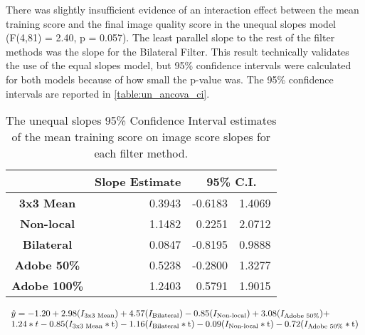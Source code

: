 \documentclass{ncjms}
\begin{document}
There was slightly insufficient evidence of an interaction effect between the mean training score and the final image quality score in the unequal slopes model (F(4,81) = 2.40, p = 0.057). The least parallel slope to the rest of the filter methods was the slope for the Bilateral Filter. This result technically validates the use of the equal slopes model, but 95\% confidence intervals were calculated for both models because of how small the p-value was. The 95\% confidence intervals are reported in \autoref{table:un_ancova_ci}.

\begin{table}[ht]
\caption{The unequal slopes 95\% Confidence Interval estimates of the mean training score on image score slopes for each filter method.} %
\centering %
\begin{tabular}{|c| r|r|r|} %
\hline %
& \multicolumn{1}{c|}{\textbf{Slope Estimate}} & \multicolumn{2}{c|}{\textbf{95\% C.I.}}  \\ [0.5ex]
\hline
\textbf{3x3 Mean} & 0.3943 & -0.6183 & 1.4069  \\ 
\textbf{Non-local} & 1.1482 & 0.2251 & 2.0712 \\
\textbf{Bilateral} & 0.0847 & -0.8195 & 0.9888 \\
\textbf{Adobe 50\%} & 0.5238 & -0.2800 & 1.3277 \\
\textbf{Adobe 100\%} & 1.2403 & 0.5791 & 1.9015 \\ [1ex]
\hline %
\end{tabular}
\label{table:un_ancova_ci} %
\end{table}


\begin{equation}
  \begin{array}{l}
    \Hat{y}=-1.20 + 2.98(I_{\text{3x3 Mean}}) + 4.57(I_{\text{Bilateral}}) - 0.85(I_{\text{Non-local}}) + 3.08(I_{\text{Adobe 50\%}}) + \\ 
    1.24*t - 0.85(I_{\text{3x3 Mean}}*\text{t}) - 1.16(I_{\text{Bilateral}}*\text{t}) - 0.09(I_{\text{Non-local}}*\text{t}) - 0.72(I_{\text{Adobe 50\%}}*\text{t})
  \end{array}
\end{equation}
\end{document}
